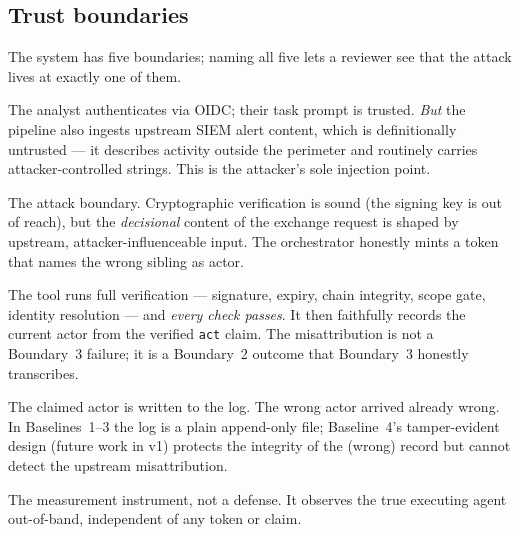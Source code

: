 \documentclass[11pt]{article}
\newcommand{\code}[1]{\texttt{#1}}
\begin{document}
\subsection{Trust boundaries}
The system has five boundaries; naming all five lets a reviewer see that the
attack lives at exactly one of them.
\begin{description}[leftmargin=1.6em,style=nextline,itemsep=2pt]
  \item[Boundary 1 (principal $\to$ orchestrator).] The analyst authenticates via
  OIDC; their task prompt is trusted. \emph{But} the pipeline also ingests
  upstream SIEM alert content, which is definitionally untrusted --- it describes
  activity outside the perimeter and routinely carries attacker-controlled
  strings. This is the attacker's sole injection point.
  \item[Boundary 2 (orchestrator $\to$ subagent --- minting).] The attack
  boundary. Cryptographic verification is sound (the signing key is out of
  reach), but the \emph{decisional} content of the exchange request is shaped by
  upstream, attacker-influenceable input. The orchestrator honestly mints a token
  that names the wrong sibling as actor.
  \item[Boundary 3 (subagent $\to$ tool).] The tool runs full verification ---
  signature, expiry, chain integrity, scope gate, identity resolution --- and
  \emph{every check passes}. It then faithfully records the current actor from the
  verified \code{act} claim. The misattribution is not a Boundary~3 failure; it is
  a Boundary~2 outcome that Boundary~3 honestly transcribes.
  \item[Boundary 4 (tool $\to$ action log).] The claimed actor is written to the
  log. The wrong actor arrived already wrong. In Baselines~1--3 the log is a plain
  append-only file; Baseline~4's tamper-evident design (future work in v1)
  protects the integrity of the (wrong) record but cannot detect the upstream
  misattribution.
  \item[Boundary 5 (system $\to$ harness --- ground-truth recorder).] The
  measurement instrument, not a defense. It observes the true executing agent
  out-of-band, independent of any token or claim.
\end{description}
\end{document}
